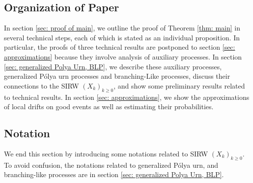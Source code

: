 \documentclass[twoside,12pt,a4paper]{article}
\numberwithin{equation}{section}
\newcommand\TBD{\textcolor{red}{TBD.}}
\begin{document}
	
	\subsection{Organization of Paper}
	In section \ref{sec: proof of main}, we outline the proof of Theorem \ref{thm: main} in several technical steps, each of which is stated as an individual proposition. In particular, the proofs of three technical results are postponed to section \ref{sec: approximations} because they involve analysis of auxiliary processes. In section \ref{sec: generalized Polya Urn, BLP}, we describe these auxiliary processes, generalized P\'{o}lya urn processes and branching-Like processes, discuss their connections to the SIRW $(X_k)_{k\geq 0}$, and show some preliminary results related to technical results. In section \ref{sec: approximations}, we show the approximations of local drifts on good events as well as estimating their probabilities. 
	
	\subsection{Notation}
	
	We end this section by introducing some notations related to SIRW $(X_k)_{k\geq 0}$. To avoid confusion, the notations related to generalized P\'{o}lya urn, and branching-like processes are in section \ref{sec: generalized Polya Urn, BLP}.
	
\end{document}
